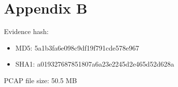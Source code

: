 \documentclass{article}
\begin{document}
   \section*{\fontsize{14pt}{17pt}\selectfont Appendix B}\label{sec:selectfont-appendix-b}
   Evidence hash:
   \begin{itemize}
    \item MD5: 5a1b3fa6e098c9df19f791cde578e967
    \item SHA1: a019327687851807a6a23e2245d2e465d52d628a
   \end{itemize}

   PCAP file size: 50.5 MB
\end{document}
